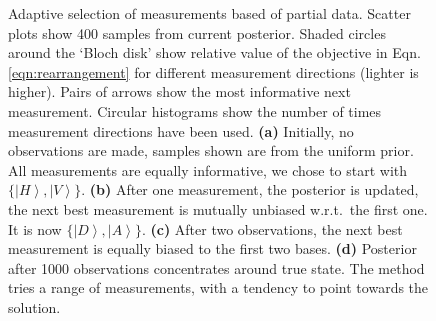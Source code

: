 \documentclass[aps,twocolumn,prl]{revtex4-1}
\begin{document}
\begin{figure}

\caption{Adaptive selection of measurements based of partial data. Scatter plots show 400 samples from current posterior. Shaded circles around the `Bloch disk' show relative value of the objective in Eqn.\,\eqref{eqn:rearrangement} for different measurement directions (lighter is higher). Pairs of arrows show the most informative next measurement. Circular histograms show the number of times measurement directions have been used. \textbf{(a)}  Initially, no observations are made, samples shown are from the uniform prior. All measurements are equally informative, we chose to start with $\{\left\vert H\right\rangle,\left\vert V\right\rangle\}$. \textbf{(b)}  After one measurement, the posterior is updated, the next best measurement is mutually unbiased w.r.t.\ the first one. It is now $\{\left\vert D\right\rangle,\left\vert A\right\rangle\}$. \textbf{(c)} After two observations, the next best measurement is equally biased to the first two bases. \textbf{(d)} Posterior after 1000 observations concentrates around true state. The method tries a range of measurements, with a tendency to point towards the solution.
\label{fig:Bloch disk}}
\end{figure}
\end{document}
